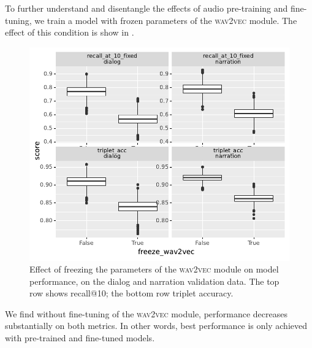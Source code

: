 To further understand and disentangle the effects of audio pre-training and 
fine-tuning, we train a model with frozen parameters of the 
\textsc{wav2vec} module. The effect of this condition is show in .
\begin{figure}[htb]
  \centering
  \includegraphics[width=\columnwidth]{results/ablations/freeze_wav2vec.pdf}
  \caption{Effect of freezing the parameters of the \textsc{wav2vec}
    module on model performance, on the dialog and narration
    validation data. The top row shows recall@10; the bottom row
    triplet accuracy.}
  \label{fig:freeze_wav2vec}
\end{figure}
We find without fine-tuning of the \textsc{wav2vec} module, performance decreases substantially 
on both metrics. In other words, best performance is only achieved with pre-trained and 
fine-tuned models.


